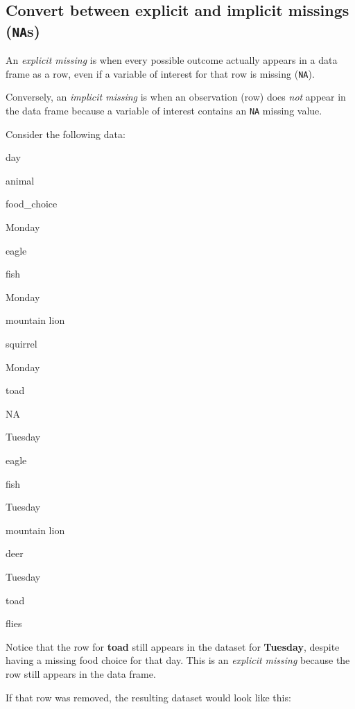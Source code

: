 \documentclass[]{book}
\newenvironment{Shaded}{\begin{snugshade}}{\end{snugshade}}
\newcommand{\KeywordTok}[1]{\textcolor[rgb]{0.13,0.29,0.53}{\textbf{#1}}}
\newcommand{\NormalTok}[1]{#1}
\newcommand{\OperatorTok}[1]{\textcolor[rgb]{0.81,0.36,0.00}{\textbf{#1}}}
\newcommand{\StringTok}[1]{\textcolor[rgb]{0.31,0.60,0.02}{#1}}
\begin{document}
\hypertarget{convert-between-explicit-and-implicit-missings-nas}{%
\subsection{\texorpdfstring{Convert between explicit and implicit missings (\texttt{NA}s)}{Convert between explicit and implicit missings (NAs)}}\label{convert-between-explicit-and-implicit-missings-nas}}

An \emph{explicit missing} is when every possible outcome actually appears in a data frame as a row, even if a variable of interest for that row is missing (\texttt{NA}).

Conversely, an \emph{implicit missing} is when an observation (row) does \emph{not} appear in the data frame because a variable of interest contains an \texttt{NA} missing value.

Consider the following data:

day

animal

food\_choice

Monday

eagle

fish

Monday

mountain lion

squirrel

Monday

toad

NA

Tuesday

eagle

fish

Tuesday

mountain lion

deer

Tuesday

toad

flies

Notice that the row for \textbf{toad} still appears in the dataset for \textbf{Tuesday}, despite having a missing food choice for that day. This is an \emph{explicit missing} because the row still appears in the data frame.

If that row was removed, the resulting dataset would look like this:

\begin{Shaded}
\end{Shaded}
\end{document}
